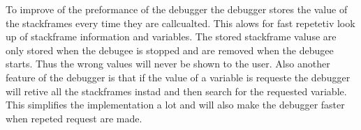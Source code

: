 To improve of the preformance of the debugger the debugger stores the value of the stackframes every time they are callcualted.
This alows for fast repetetiv look up of stackframe information and variables.
The stored stackframe valuse are only stored when the \gls{debugee} is stopped and are removed when the \gls{debugee} starts.
Thus the wrong values will never be shown to the user.
Also another feature of the debugger is that if the value of a variable is requeste the debugger will retive all the stackframes instad and then search for the requested variable.
This simplifies the implementation a lot and will also make the debugger faster when repeted request are made.

